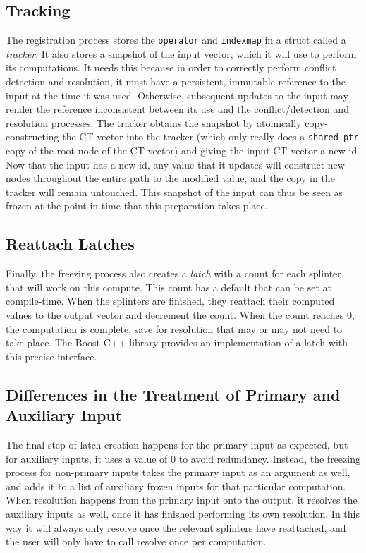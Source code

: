 \subsection{Tracking}
The registration process stores the \texttt{operator} and \texttt{indexmap} in a struct
called a \textit{tracker}. It also stores a snapshot of the input vector, which it
will use to perform its computations. It needs this because in order to
correctly perform conflict detection and resolution, it must have a persistent,
immutable reference to the input at the time it was used. Otherwise, subsequent
updates to the input may render the reference inconsistent between its use and
the conflict/detection and resolution processes. The tracker obtains the
snapshot by atomically copy-constructing the CT vector into the tracker (which
only really does a \texttt{shared\_ptr} copy of the root node of the CT vector)
and giving the input CT vector a new id. Now that the input has a new id, any
value that it updates will construct new nodes throughout the entire path to the
modified value, and the copy in the tracker will remain untouched. This snapshot
of the input can thus be seen as frozen at the point in time that this
preparation takes place.

\subsection{Reattach Latches}
Finally, the freezing process also creates a \textit{latch} with a count for each
splinter that will work on this compute. This count has a default that can be
set at compile-time. When the splinters are finished, they reattach their
computed values to the output vector and decrement the count. When the count
reaches 0, the computation is complete, save for resolution that may or may not
need to take place. The Boost C++ library provides an implementation of a latch with 
this precise interface.

\subsection{Differences in the Treatment of Primary and Auxiliary Input}
The final step of latch creation happens for the primary input as expected, but for 
auxiliary inputs, it uses a value of 0 to avoid redundancy. 
Instead, the freezing process for non-primary inputs takes the primary input as an 
argument as well, and adds it to a list of auxiliary frozen inputs for that particular
computation. When resolution happens from the primary input onto the output, it resolves 
the auxiliary inputs as well, once it has finished performing its own resolution. In 
this way it will always only resolve once the relevant splinters have reattached, and 
the user will only have to call resolve once per computation.

